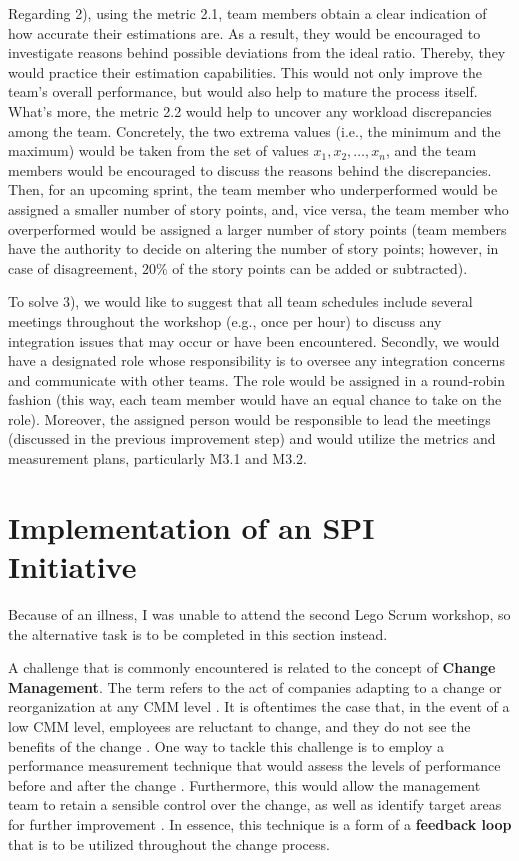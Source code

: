 \documentclass[conference]{IEEEtran}
\begin{document}
Regarding 2), using the metric 2.1, team members obtain a clear indication of
how accurate their estimations are. As a result, they would be encouraged to
investigate reasons behind possible deviations from the ideal ratio. Thereby,
they would practice their estimation capabilities. This would not only improve
the team's overall performance, but would also help to mature the process
itself. What's more, the metric 2.2 would help to uncover any workload
discrepancies among the team. Concretely, the two extrema values (i.e., the
minimum and the maximum) would be taken from the set of values $x_1, x_2,
\dots, x_n$, and the team members would be encouraged to discuss the reasons
behind the discrepancies. Then, for an upcoming sprint, the team member who
underperformed would be assigned a smaller number of story points, and, vice
versa, the team member who overperformed would be assigned a larger number of
story points (team members have the authority to decide on altering the number
of story points; however, in case of disagreement, $20\%$ of the story points
can be added or subtracted).

To solve 3), we would like to suggest that all team schedules include several
meetings throughout the workshop (e.g., once per hour) to discuss any
integration issues that may occur or have been encountered. Secondly, we would
have a designated role whose responsibility is to oversee any integration
concerns and communicate with other teams. The role would be assigned in a
round-robin fashion (this way, each team member would have an equal chance to
take on the role). Moreover, the assigned person would be responsible to lead
the meetings (discussed in the previous improvement step) and would utilize the
metrics and measurement plans, particularly M3.1 and M3.2.


\section{Implementation of an SPI Initiative}
\label{sec:implementation}

Because of an illness, I was unable to attend the second Lego Scrum workshop,
so the alternative task is to be completed in this section instead.

A challenge that is commonly encountered is related to the concept of
\textbf{Change Management}. The term refers to the act of companies adapting
to a change or reorganization at any CMM level \cite{Beecham2003}. It is
oftentimes the case that, in the event of a low CMM level, employees are
reluctant to change, and they do not see the benefits of the change
\cite{Beecham2003}. One way to tackle this challenge is to employ a performance
measurement technique that would assess the levels of performance before and
after the change \cite{Oakland2007}. Furthermore, this would allow the
management team to retain a sensible control over the change, as well as
identify target areas for further improvement \cite{Oakland2007}. In essence,
this technique is a form of a \textbf{feedback loop} that is to be utilized
throughout the change process.
\end{document}
